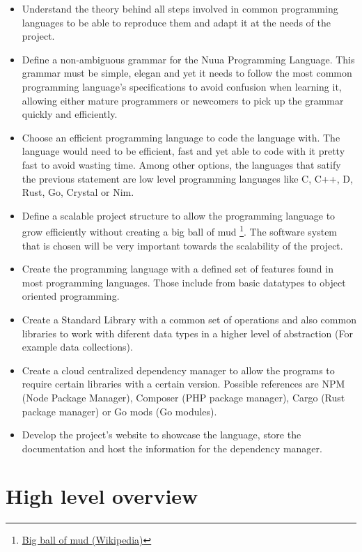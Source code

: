 \begin{itemize}
    \item Understand the theory behind all steps involved in common programming languages to be able to reproduce them and adapt it
        at the needs of the project.
    \item Define a non-ambiguous grammar for the Nuua Programming Language. This grammar must be simple, elegan and yet it needs to follow the most
        common programming language's specifications to avoid confusion when learning it, allowing either mature programmers or newcomers to
        pick up the grammar quickly and efficiently.
    \item Choose an efficient programming language to code the language with. The language would need to be efficient, fast and yet able to code with it
        pretty fast to avoid wasting time. Among other options, the languages that satify the previous statement are low level programming languages like
        C, C++, D, Rust, Go, Crystal or Nim.
    \item Define a scalable project structure to allow the programming language to grow efficiently without creating a
        big ball of mud \footnote{\href{https://en.wikipedia.org/wiki/Big_ball_of_mud}{Big ball of mud (Wikipedia)}}. The software system
        that is chosen will be very important towards the scalability of the project.
    \item Create the programming language with a defined set of features found in most programming languages. Those include from basic datatypes
        to object oriented programming.
    \item Create a Standard Library with a common set of operations and also common libraries to work with diferent data types in
        a higher level of abstraction (For example data collections).
    \item Create a cloud centralized dependency manager to allow the programs to require certain libraries with a certain version. Possible
        references are NPM (Node Package Manager), Composer (PHP package manager), Cargo (Rust package manager) or Go mods (Go modules).
    \item Develop the project's website to showcase the language, store the documentation and host the information for the dependency manager.
\end{itemize}

\section{High level overview}

